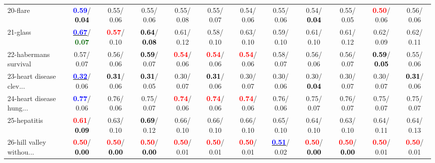\begin{table}[h]
\begin{center}
{\begin{tabular}{lc|c|c|c|c|c|c|c|c|c|c}
20-flare & \textcolor{blue}{\textbf{  0.59}}/\textcolor{black}{\textbf{  0.04}} &   0.55/  0.06 &   0.55/  0.06 &   0.55/  0.08 &   0.55/  0.07 &   0.54/  0.06 &   0.55/  0.06 &   0.54/\textcolor{black}{\textbf{  0.04}} &   0.55/  0.05 & \textcolor{red}{\textbf{  0.50}}/  0.06 &   0.56/  0.06 \\
21-glass & \underline{\textcolor{blue}{\textbf{  0.67}}}/\textcolor{darkgreen}{\textbf{  0.07}} & \textcolor{red}{\textbf{  0.57}}/  0.10 & \textcolor{black}{\textbf{  0.64}}/\textcolor{black}{\textbf{  0.08}} &   0.61/  0.12 &   0.58/  0.10 &   0.63/  0.10 &   0.59/  0.10 &   0.61/  0.10 &   0.61/  0.12 &   0.62/  0.09 &   0.62/  0.11 \\ \hline
22-habermans survival &   0.57/  0.07 &   0.56/  0.06 & \textcolor{black}{\textbf{  0.59}}/  0.07 & \textcolor{red}{\textbf{  0.54}}/  0.06 & \textcolor{red}{\textbf{  0.54}}/  0.06 & \textcolor{red}{\textbf{  0.54}}/  0.06 &   0.58/  0.07 &   0.56/  0.06 &   0.56/  0.07 & \textcolor{black}{\textbf{  0.59}}/\textcolor{black}{\textbf{  0.05}} &   0.55/  0.06 \\
23-heart disease clev... & \underline{\textcolor{blue}{\textbf{  0.32}}}/  0.06 & \textcolor{black}{\textbf{  0.31}}/  0.06 & \textcolor{black}{\textbf{  0.31}}/  0.05 &   0.30/  0.07 & \textcolor{black}{\textbf{  0.31}}/  0.06 &   0.30/  0.07 &   0.30/  0.06 &   0.30/\textcolor{black}{\textbf{  0.04}} &   0.30/  0.07 &   0.30/  0.07 & \textcolor{black}{\textbf{  0.31}}/  0.06 \\
24-heart disease hung... & \textcolor{blue}{\textbf{  0.77}}/  0.06 &   0.76/  0.06 &   0.75/  0.07 & \textcolor{red}{\textbf{  0.74}}/  0.06 & \textcolor{red}{\textbf{  0.74}}/  0.06 & \textcolor{red}{\textbf{  0.74}}/  0.06 &   0.76/  0.06 &   0.75/  0.07 &   0.76/  0.07 &   0.75/  0.07 &   0.75/  0.07 \\
25-hepatitis & \textcolor{red}{\textbf{  0.61}}/\textcolor{black}{\textbf{  0.09}} &   0.63/  0.10 & \textcolor{black}{\textbf{  0.69}}/  0.12 &   0.66/  0.10 &   0.66/  0.10 &   0.66/  0.10 &   0.65/  0.10 &   0.64/  0.10 &   0.63/  0.10 &   0.64/  0.11 &   0.64/  0.13 \\
26-hill valley withou... & \textcolor{red}{\textbf{  0.50}}/\textcolor{black}{\textbf{  0.00}} & \textcolor{red}{\textbf{  0.50}}/\textcolor{black}{\textbf{  0.00}} & \textcolor{red}{\textbf{  0.50}}/\textcolor{black}{\textbf{  0.00}} & \textcolor{red}{\textbf{  0.50}}/  0.01 & \textcolor{red}{\textbf{  0.50}}/  0.01 & \textcolor{red}{\textbf{  0.50}}/  0.01 & \underline{\textcolor{blue}{\textbf{  0.51}}}/  0.02 & \textcolor{red}{\textbf{  0.50}}/\textcolor{black}{\textbf{  0.00}} & \textcolor{red}{\textbf{  0.50}}/\textcolor{black}{\textbf{  0.00}} & \textcolor{red}{\textbf{  0.50}}/  0.01 & \textcolor{red}{\textbf{  0.50}}/  0.01 \\

\end{tabular}}
\end{center}
\end{table}

